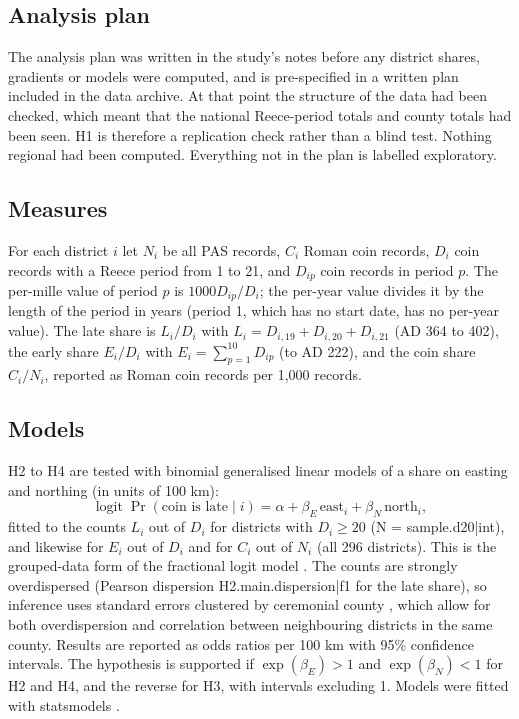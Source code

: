\documentclass[11pt,a4paper]{article}
\begin{document}
\subsection{Analysis plan}
The analysis plan was written in the study's notes before any district shares, gradients or models were computed, and is pre-specified in a written plan included in the data archive. At that point the structure of the data had been checked, which meant that the national Reece-period totals and county totals had been seen. H1 is therefore a replication check rather than a blind test. Nothing regional had been computed. Everything not in the plan is labelled exploratory.

\subsection{Measures}
For each district $i$ let $N_i$ be all PAS records, $C_i$ Roman coin records, $D_i$ coin records with a Reece period from 1 to 21, and $D_{ip}$ coin records in period $p$. The per-mille value of period $p$ is $1000 D_{ip}/D_i$; the per-year value divides it by the length of the period in years (period 1, which has no start date, has no per-year value). The late share is $L_i/D_i$ with $L_i = D_{i,19}+D_{i,20}+D_{i,21}$ (AD 364 to 402), the early share $E_i/D_i$ with $E_i = \sum_{p=1}^{10} D_{ip}$ (to AD 222), and the coin share $C_i/N_i$, reported as Roman coin records per 1,000 records.

\subsection{Models}
H2 to H4 are tested with binomial generalised linear models of a share on easting and northing (in units of 100 km):
\begin{equation}
\operatorname{logit} \Pr(\text{coin is late} \mid i) = \alpha + \beta_E\, \mathrm{east}_i + \beta_N\, \mathrm{north}_i,
\end{equation}
fitted to the counts $L_i$ out of $D_i$ for districts with $D_i \ge 20$ (N = {{sample.d20|int}}), and likewise for $E_i$ out of $D_i$ and for $C_i$ out of $N_i$ (all 296 districts). This is the grouped-data form of the fractional logit model \citep{papke1996}. The counts are strongly overdispersed (Pearson dispersion {{H2.main.dispersion|f1}} for the late share), so inference uses standard errors clustered by ceremonial county \citep{cameron2015}, which allow for both overdispersion and correlation between neighbouring districts in the same county. Results are reported as odds ratios per 100 km with 95\% confidence intervals. The hypothesis is supported if $\exp(\beta_E) > 1$ and $\exp(\beta_N) < 1$ for H2 and H4, and the reverse for H3, with intervals excluding 1. Models were fitted with statsmodels \citep{seabold2010}.
\end{document}
